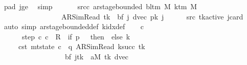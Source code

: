 \begin{isabellebody}
\ pad{}\ jge\ \isamarkupfalse%
\ simp\isanewline
\ \ \isamarkupfalse%
\isanewline
\ \ \isamarkupfalse%
\ src{\isacharunderscore}{\kern0pt}c{\isacharcolon}{\kern0pt}\ {\isachardoublequoteopen}ar{\isacharunderscore}{\kern0pt}stage{\isacharunderscore}{\kern0pt}bounded\ {\isacharparenleft}{\kern0pt}bl{\isacharunderscore}{\kern0pt}tm\ M{\isacharparenright}{\kern0pt}\ {\isacharparenleft}{\kern0pt}k{\isacharunderscore}{\kern0pt}tm\ M{\isacharparenright}{\kern0pt}\isanewline
\ \ \ \ \ \ \ \ \ \ \ \ \ \ \ \ \ {\isacharparenleft}{\kern0pt}AR{\isacharunderscore}{\kern0pt}SimRead{\isacharcomma}{\kern0pt}\ {\isacharquery}{\kern0pt}tk{\isacharcomma}{\kern0pt}\ {}{\isacharcomma}{\kern0pt}\ {\isacharquery}{\kern0pt}bf\ j{\isacharcomma}{\kern0pt}\ dvec{\isacharcomma}{\kern0pt}\ {\isacharquery}{\kern0pt}pk\ j{\isacharparenright}{\kern0pt}{\isachardoublequoteclose}\isanewline
\ \ \ \ \isamarkupfalse%
\ src{}\ tk{\isacharunderscore}{\kern0pt}active\ jcard\ \isamarkupfalse%
\ {\isacharparenleft}{\kern0pt}auto\ simp{\isacharcolon}{\kern0pt}\ ar{\isacharunderscore}{\kern0pt}stage{\isacharunderscore}{\kern0pt}bounded{\isacharunderscore}{\kern0pt}def\ k{\isacharunderscore}{\kern0pt}idx{\isacharunderscore}{\kern0pt}def{\isacharparenright}{\kern0pt}\isanewline
\ \ \isamarkupfalse%
\ c{\isacharprime}{\kern0pt}\ \isanewline
\ \ \ \ \ \ step{\isacharcolon}{\kern0pt}\ {\isachardoublequoteopen}{\isacharparenleft}{\kern0pt}c{\isacharcomma}{\kern0pt}\ c{\isacharprime}{\kern0pt}{\isacharparenright}{\kern0pt}\ {\isasymin}\ R{\isacharprime}{\kern0pt}\ {\isacharcircum}{\kern0pt}{\isacharcircum}{\kern0pt}\ {\isacharparenleft}{\kern0pt}if\ {\isacharquery}{\kern0pt}p\ {\isacharequal}{\kern0pt}\ {}\ then\ {}\ else\ {\isacharquery}{\kern0pt}k\ {\isacharplus}{\kern0pt}\ {}{\isacharparenright}{\kern0pt}{\isachardoublequoteclose}\isanewline
\ \ \ \ \ c{\isacharprime}{\kern0pt}{\isacharunderscore}{\kern0pt}st{\isacharcolon}{\kern0pt}\ {\isachardoublequoteopen}mt{\isacharunderscore}{\kern0pt}state\ c{\isacharprime}{\kern0pt}\ {\isacharequal}{\kern0pt}\ {\isacharparenleft}{\kern0pt}q{\isacharcomma}{\kern0pt}\ AR{\isacharunderscore}{\kern0pt}SimRead{\isacharcomma}{\kern0pt}\ k{\isacharunderscore}{\kern0pt}succ\ {\isacharquery}{\kern0pt}tk{\isacharcomma}{\kern0pt}\ {}{\isacharcomma}{\kern0pt}\isanewline
\ \ \ \ \ \ \ \ \ \ \ \ \ \ \ \ \ \ {\isacharparenleft}{\kern0pt}{\isacharquery}{\kern0pt}bf\ j{\isacharparenright}{\kern0pt}{\isacharparenleft}{\kern0pt}{\isacharquery}{\kern0pt}tk\ {\isacharcolon}{\kern0pt}{\isacharequal}{\kern0pt}\ {\isacharquery}{\kern0pt}aM\ {\isacharquery}{\kern0pt}tk{\isacharparenright}{\kern0pt}{\isacharcomma}{\kern0pt}\ dvec{\isacharcomma}{\kern0pt}\isanewline

\end{isabellebody}
